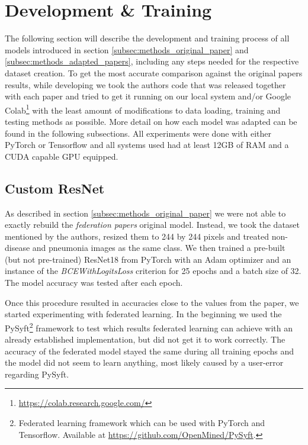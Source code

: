 \section{Development \& Training}\label{sec:dev_and_training}
The following section will describe the development and training process of all models introduced in section \ref{subsec:methods_original_paper} and \ref{subsec:methods_adapted_papers}, including any steps needed for the respective dataset creation. 
To get the most accurate comparison against the original papers results, while developing we took the authors code that was released together with each paper and tried to get it running on our local system and/or Google Colab\footnote{\url{https://colab.research.google.com/}} with the least amount of modifications to data loading, training and testing methods as possible. More detail on how each model was adapted can be found in the following subsections.
All experiments were done with either PyTorch or Tensorflow and all systems used had at least 12GB of RAM and a CUDA capable GPU equipped.


\subsection{Custom ResNet}\label{subsec:methods_resnet}
As described in section \ref{subsec:methods_original_paper} we were not able to exactly rebuild the \textit{federation papers} original model.
Instead, we took the dataset mentioned by the authors, resized them to 244 by 244 pixels and treated non-disease and pneumonia images as the same class. 
We then trained a pre-built (but not pre-trained) ResNet18 from PyTorch with an Adam optimizer and an instance of the \textit{BCEWithLogitsLoss} criterion for 25 epochs and a batch size of 32. The model accuracy was tested after each epoch.

Once this procedure resulted in accuracies close to the values from the paper, we started experimenting with federated learning. In the beginning we used the PySyft\footnote{Federated learning framework which can be used with PyTorch and Tensorflow. Available at \url{https://github.com/OpenMined/PySyft}.} framework to test which results federated learning can achieve with an already established implementation, but did not get it to work correctly. The accuracy of the federated model stayed the same during all training epochs and the model did not seem to learn anything, most likely caused by a user-error regarding PySyft.

